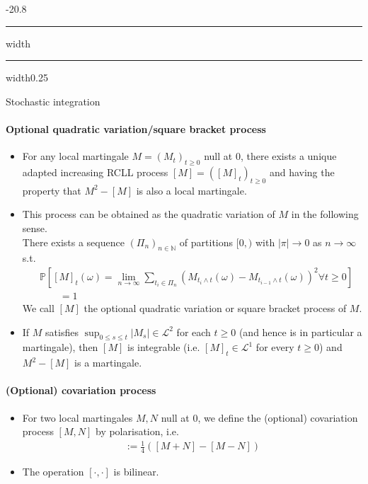 \documentclass[a4paper,landscape,8pt,fleqn]{scrartcl}
\makeatletter
\renewcommand{\subsection}{\@startsection{subsection}{1}{0mm}%
{-2\baselineskip}{0.8\baselineskip}%
{\hrule depth 0.2pt width\columnwidth\hrule depth0.75pt
width0.25\columnwidth\vspace*{1.2em}\large\bfseries}}
\makeatother
\begin{document}
\begin{multicols*}{3}
\subsection{Stochastic integration}

\paragraph{Optional quadratic variation/square bracket process}

\begin{itemize}
\item For any local martingale $M = (M_t)_{t \geq 0}$ null at 0, there exists a unique adapted increasing RCLL process $[M] = ([M]_t)_{t \geq 0}$ and having the property that $M^2 - [M]$ is also a local martingale.
\item This process can be obtained as the quadratic variation of $M$ in the following sense. \\
There exists a sequence $(\Pi_n)_{n \in \mathbb{N}}$ of partitions $[0,)$ with $|\pi| \rightarrow 0$ as $n \rightarrow \infty$ s.t.
\begin{align*}
& \mathbb{P} \left[ [M]_t(\omega) = \lim\limits_{n \rightarrow \infty} \sum_{t_i \in \Pi_n} \left( M_{t_i \wedge t}(\omega) - M_{t_{i-1}\wedge t}(\omega) \right)^2 \forall t \geq 0 \right] \\
& \qquad = 1
\end{align*}
We call $[M]$ the optional quadratic variation or square bracket process of $M$.
\item If $M$ satisfies $\sup_{0 \leq s \leq t} |M_s| \in \mathcal{L}^2$ for each $t \geq 0$ (and hence is in particular a martingale), then $[M]$ is integrable (i.e. $[M]_t \in \mathcal{L}^1$ for every $t \geq 0$) and $M^2 - [M]$ is a martingale.
\end{itemize}

\paragraph{(Optional) covariation process}

\begin{itemize}
\item For two local martingales $M, N$ null at 0, we define the (optional) covariation process $[M,N]$ by polarisation, i.e.
\begin{align*}
[M,N] := \frac{1}{4} \left( [M+N] - [M-N] \right)
\end{align*}
\item The operation $[\cdot,\cdot]$ is bilinear.
\end{itemize}


\end{multicols*}
\end{document}
